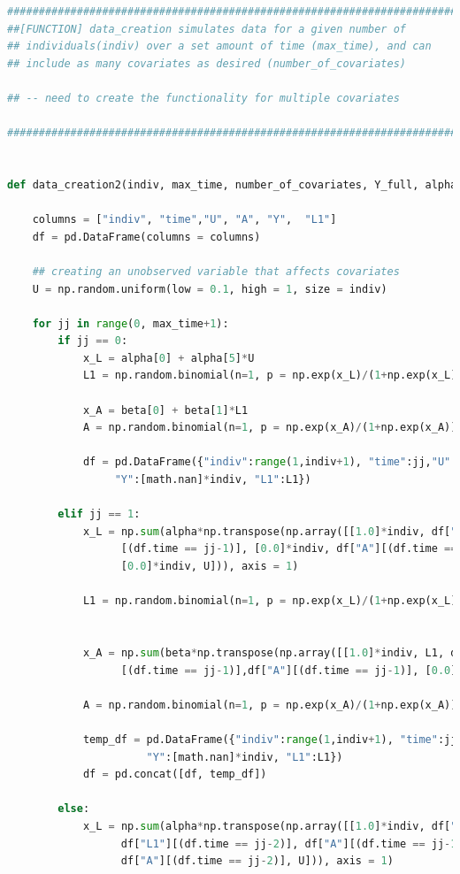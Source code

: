\begin{lstlisting}[language=Python]
#########################################################################
##[FUNCTION] data_creation simulates data for a given number of 
## individuals(indiv) over a set amount of time (max_time), and can 
## include as many covariates as desired (number_of_covariates)

## -- need to create the functionality for multiple covariates

#########################################################################


def data_creation2(indiv, max_time, number_of_covariates, Y_full, alpha, beta): 

    columns = ["indiv", "time","U", "A", "Y",  "L1"]
    df = pd.DataFrame(columns = columns)
     
    ## creating an unobserved variable that affects covariates 
    U = np.random.uniform(low = 0.1, high = 1, size = indiv)
            
    for jj in range(0, max_time+1): 
        if jj == 0: 
            x_L = alpha[0] + alpha[5]*U 
            L1 = np.random.binomial(n=1, p = np.exp(x_L)/(1+np.exp(x_L)))

            x_A = beta[0] + beta[1]*L1 
            A = np.random.binomial(n=1, p = np.exp(x_A)/(1+np.exp(x_A)))

            df = pd.DataFrame({"indiv":range(1,indiv+1), "time":jj,"U":U, "A":A, \
                 "Y":[math.nan]*indiv, "L1":L1})
            
        elif jj == 1: 
            x_L = np.sum(alpha*np.transpose(np.array([[1.0]*indiv, df["L1"]\
                  [(df.time == jj-1)], [0.0]*indiv, df["A"][(df.time == jj-1)],\
                  [0.0]*indiv, U])), axis = 1)

            L1 = np.random.binomial(n=1, p = np.exp(x_L)/(1+np.exp(x_L)))


            x_A = np.sum(beta*np.transpose(np.array([[1.0]*indiv, L1, df["L1"]\
                  [(df.time == jj-1)],df["A"][(df.time == jj-1)], [0.0]*indiv ])), axis = 1)
                         
            A = np.random.binomial(n=1, p = np.exp(x_A)/(1+np.exp(x_A)))

            temp_df = pd.DataFrame({"indiv":range(1,indiv+1), "time":jj, "U":U, "A":A,\
                      "Y":[math.nan]*indiv, "L1":L1})
            df = pd.concat([df, temp_df])

        else: 
            x_L = np.sum(alpha*np.transpose(np.array([[1.0]*indiv, df["L1"][(df.time == jj-1)], \
                  df["L1"][(df.time == jj-2)], df["A"][(df.time == jj-1)], \
                  df["A"][(df.time == jj-2)], U])), axis = 1)


\end{lstlisting}
